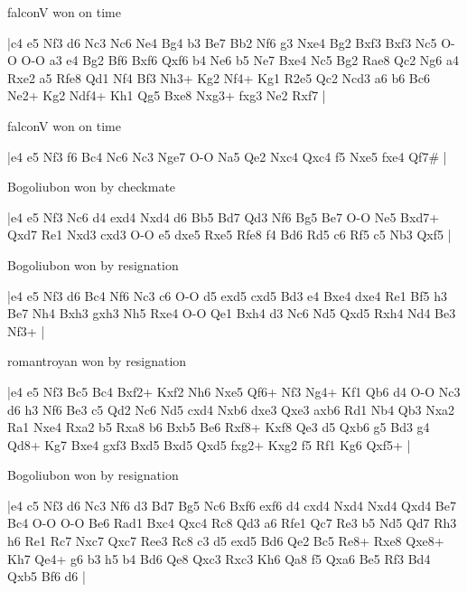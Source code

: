 \showboard

falconV won on time

\makegametitle
|c4 e5 Nf3 d6 Nc3 Nc6 Ne4 Bg4 b3 Be7 Bb2 Nf6 g3 Nxe4 Bg2 Bxf3 Bxf3 Nc5 O-O O-O a3 e4 Bg2 Bf6 Bxf6 Qxf6 b4 Ne6 b5 Ne7 Bxe4 Nc5 Bg2 Rae8 Qc2 Ng6 a4 Rxe2 a5 Rfe8 Qd1 Nf4 Bf3 Nh3+ Kg2 Nf4+ Kg1 R2e5 Qc2 Ncd3 a6 b6 Bc6 Ne2+ Kg2 Ndf4+ Kh1 Qg5 Bxe8 Nxg3+ fxg3 Ne2 Rxf7  |

\showboard

falconV won on time

\makegametitle
|e4 e5 Nf3 f6 Bc4 Nc6 Nc3 Nge7 O-O Na5 Qe2 Nxc4 Qxc4 f5 Nxe5 fxe4 Qf7\#  |

\showboard

Bogoliubon won by checkmate

\makegametitle
|e4 e5 Nf3 Nc6 d4 exd4 Nxd4 d6 Bb5 Bd7 Qd3 Nf6 Bg5 Be7 O-O Ne5 Bxd7+ Qxd7 Re1 Nxd3 cxd3 O-O e5 dxe5 Rxe5 Rfe8 f4 Bd6 Rd5 c6 Rf5 c5 Nb3 Qxf5  |

\showboard

Bogoliubon won by resignation

\makegametitle
|e4 e5 Nf3 d6 Bc4 Nf6 Nc3 c6 O-O d5 exd5 cxd5 Bd3 e4 Bxe4 dxe4 Re1 Bf5 h3 Be7 Nh4 Bxh3 gxh3 Nh5 Rxe4 O-O Qe1 Bxh4 d3 Nc6 Nd5 Qxd5 Rxh4 Nd4 Be3 Nf3+  |

\showboard

romantroyan won by resignation

\makegametitle
|e4 e5 Nf3 Bc5 Bc4 Bxf2+ Kxf2 Nh6 Nxe5 Qf6+ Nf3 Ng4+ Kf1 Qb6 d4 O-O Nc3 d6 h3 Nf6 Be3 c5 Qd2 Nc6 Nd5 cxd4 Nxb6 dxe3 Qxe3 axb6 Rd1 Nb4 Qb3 Nxa2 Ra1 Nxe4 Rxa2 b5 Rxa8 b6 Bxb5 Be6 Rxf8+ Kxf8 Qe3 d5 Qxb6 g5 Bd3 g4 Qd8+ Kg7 Bxe4 gxf3 Bxd5 Bxd5 Qxd5 fxg2+ Kxg2 f5 Rf1 Kg6 Qxf5+  |

\showboard

Bogoliubon won by resignation

\makegametitle
|e4 c5 Nf3 d6 Nc3 Nf6 d3 Bd7 Bg5 Nc6 Bxf6 exf6 d4 cxd4 Nxd4 Nxd4 Qxd4 Be7 Bc4 O-O O-O Be6 Rad1 Bxc4 Qxc4 Rc8 Qd3 a6 Rfe1 Qc7 Re3 b5 Nd5 Qd7 Rh3 h6 Re1 Rc7 Nxc7 Qxc7 Ree3 Rc8 c3 d5 exd5 Bd6 Qe2 Bc5 Re8+ Rxe8 Qxe8+ Kh7 Qe4+ g6 b3 h5 b4 Bd6 Qe8 Qxc3 Rxc3 Kh6 Qa8 f5 Qxa6 Be5 Rf3 Bd4 Qxb5 Bf6 d6  |

